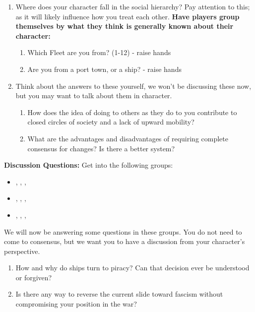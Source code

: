 \documentclass[green]{GL2020}
\begin{document}
\begin{enumerate}
	\item Where does your character fall in the social hierarchy? Pay attention to this; as it will likely influence how you treat each other. \textbf{Have players group themselves by what they think is generally known about their character:}
	\begin{enumerate}
		\item Which Fleet are you from? (1-12) - raise hands
		\item Are you from a port town, or a ship? - raise hands
	\end{enumerate}
	\item Think about the answers to these yourself, we won’t be discussing these now, but you may want to talk about them in character.
	\begin{enumerate}
		\item How does the idea of doing to others as they do to you contribute to closed circles of society and a lack of upward mobility?
		\item What are the advantages and disadvantages of requiring complete consensus for changes? Is there a better system?
	\end{enumerate}
\end{enumerate}


\textbf{Discussion Questions:}
Get into the following groups:
\begin{itemize}
	\item \cInitiate{}, \cPresident{}, \cJuniorStatesman{}, \cBunker{}
	\item \cPirateChild{}, \cFlowPriest{}, \cPirate{}, \cChupAvenger{}
	\item \cWarlordDaughter{}, \cChupLeader{}, \cChupSecond{}, \cEbbPriest{}
\end{itemize}

We will now be answering some questions in these groups.  You do not need to come to consensus, but we want you to have a discussion from your character’s perspective.

\begin{enumerate}
	\item How and why do ships turn to piracy? Can that decision ever be understood or forgiven?
	\item Is there any way to reverse the current slide toward fascism without compromising your position in the war?
\end{enumerate}
\end{document}
